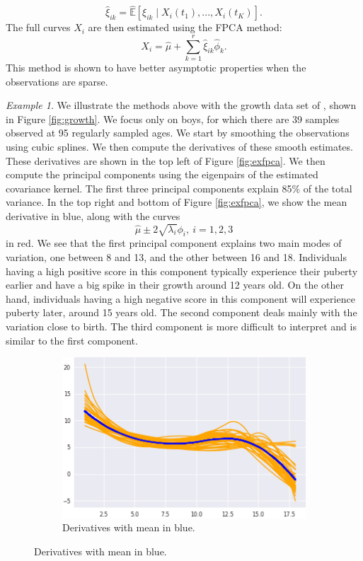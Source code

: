 \documentclass[10pt, a4paper]{report}
\newcommand{\E}[0]{\mathbb{E}}
\theoremstyle{definition}
\theoremstyle{remark}
\newtheorem{ex}{Example}
\begin{document}
$$\hat{\xi}_{ik} = \widehat{\E}[\xi_{ik}\mid X_i(t_1),...,X_i(t_K)].$$
The full curves $X_i$ are then estimated using the FPCA method:
$$X_i= \hat{\mu} + \sum_{k=1}^{r} \hat{\xi}_{ik} \hat{\phi}_{k}.$$
This method is shown to have better asymptotic properties when the observations are sparse.
\begin{ex}
	We illustrate the methods above with the growth data set of \cite{growth}, shown in Figure \ref{fig:growth}. We focus only on boys, for which there are 39 samples observed at 95 regularly sampled ages. We start by smoothing the observations using cubic splines. We then compute the derivatives of these smooth estimates. These derivatives are shown in the top left of Figure \ref{fig:exfpca}. We then compute the principal components using the eigenpairs of the estimated covariance kernel. The first three principal components explain 85\% of the total variance. In the top right and bottom of Figure \ref{fig:exfpca}, we show the mean derivative in blue, along with the curves
	$$\hat{\mu} \pm 2\sqrt{\lambda_i}\phi_i, \ i=1,2,3$$
	in red. We see that the first principal component explains two main modes of variation, one between 8 and 13, and the other between 16 and 18. Individuals having a high positive score in this component typically experience their puberty earlier and have a big spike in their growth around 12 years old. On the other hand, individuals having a high negative score in this component will experience puberty later, around 15 years old. The second component deals mainly with the variation close to birth. The third component is more difficult to interpret and is similar to the first component.
	\begin{figure}[H]
		\centering
		\begin{subfigure}{.4\textwidth}
			\centering
			\includegraphics[width=.8\linewidth]{Code/images/14/boys}
			\caption{Derivatives with mean in blue.}

\end{subfigure}
\end{figure}
\end{ex}
\end{document}
